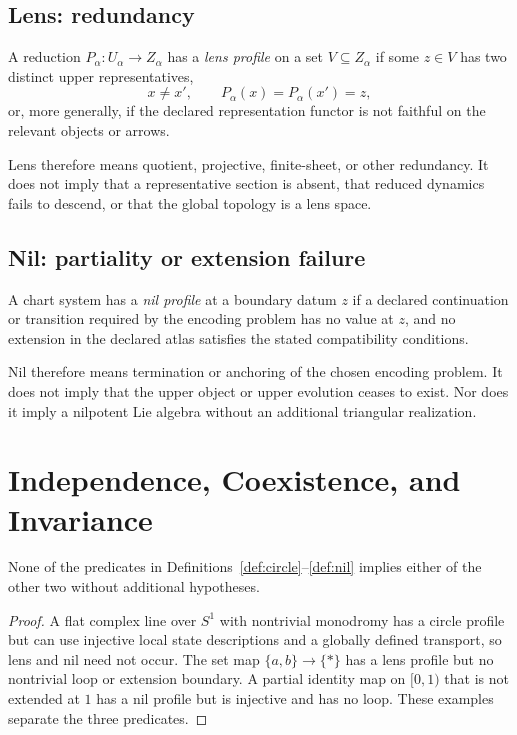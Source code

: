 \documentclass[11pt]{article}
\begin{document}
\subsection{Lens: redundancy}

\begin{definition}\label{def:lens}
A reduction $P_\alpha:U_\alpha\to Z_\alpha$ has a \emph{lens profile} on a
set $V\subseteq Z_\alpha$ if some $z\in V$ has two distinct upper
representatives,
\[
x\neq x',
\qquad
P_\alpha(x)=P_\alpha(x')=z,
\]
or, more generally, if the declared representation functor is not faithful on
the relevant objects or arrows.
\end{definition}

Lens therefore means quotient, projective, finite-sheet, or other redundancy.
It does not imply that a representative section is absent, that reduced
dynamics fails to descend, or that the global topology is a lens space.

\subsection{Nil: partiality or extension failure}

\begin{definition}\label{def:nil}
A chart system has a \emph{nil profile} at a boundary datum $z$ if a declared
continuation or transition required by the encoding problem has no value at
$z$, and no extension in the declared atlas satisfies the stated compatibility
conditions.
\end{definition}

Nil therefore means termination or anchoring of the chosen encoding problem.
It does not imply that the upper object or upper evolution ceases to exist.
Nor does it imply a nilpotent Lie algebra without an additional triangular
realization.

\section{Independence, Coexistence, and Invariance}

\begin{proposition}\label{prop:independence}
None of the predicates in Definitions~\ref{def:circle}--\ref{def:nil}
implies either of the other two without additional hypotheses.
\end{proposition}

\begin{proof}
A flat complex line over $S^1$ with nontrivial monodromy has a circle profile
but can use injective local state descriptions and a globally defined
transport, so lens and nil need not occur.  The set map
$\{a,b\}\to\{\ast\}$ has a lens profile but no nontrivial loop or extension
boundary.  A partial identity map on $[0,1)$ that is not extended at $1$ has
a nil profile but is injective and has no loop.  These examples separate the
three predicates.
\end{proof}
\end{document}
